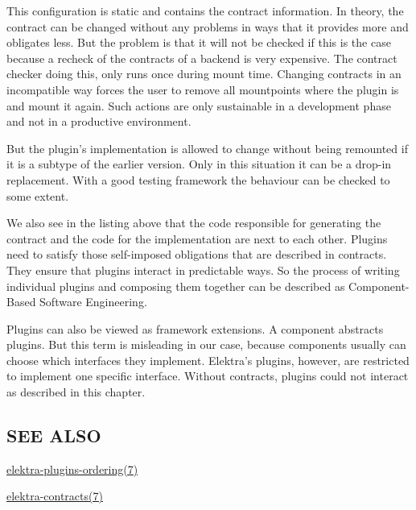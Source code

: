 This configuration is static and contains the contract information. In theory, the contract can be changed without any problems in ways that it provides more and obligates less. But the problem is that it will not be checked if this is the case because a recheck of the contracts of a backend is very expensive. The contract checker doing this, only runs once during mount time. Changing contracts in an incompatible way forces the user to remove all mountpoints where the plugin is and mount it again. Such actions are only sustainable in a development phase and not in a productive environment.

But the plugin's implementation is allowed to change without being remounted if it is a subtype of the earlier version. Only in this situation it can be a drop-\/in replacement. With a good testing framework the behaviour can be checked to some extent.

We also see in the listing above that the code responsible for generating the contract and the code for the implementation are next to each other. Plugins need to satisfy those self-\/imposed obligations that are described in contracts. They ensure that plugins interact in predictable ways. So the process of writing individual plugins and composing them together can be described as Component-\/\+Based Software Engineering.

Plugins can also be viewed as framework extensions. A component abstracts plugins. But this term is misleading in our case, because components usually can choose which interfaces they implement. Elektra's plugins, however, are restricted to implement one specific interface. Without contracts, plugins could not interact as described in this chapter.

\subsection*{S\+E\+E A\+L\+S\+O}


\begin{DoxyItemize}
\item \hyperlink{md_doc_help_elektra-plugins-ordering_doc_help_elektra-plugins-ordering_md}{elektra-\/plugins-\/ordering(7)}
\item \hyperlink{md_doc_help_elektra-contracts_doc_help_elektra-contracts_md}{elektra-\/contracts(7)} 
\end{DoxyItemize}